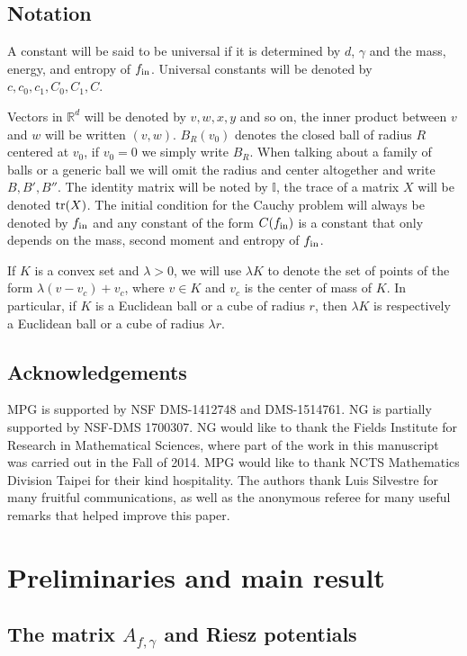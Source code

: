 \documentclass[12pt,american]{amsart}
\numberwithin{equation}{section}
\theoremstyle{plain}
\theoremstyle{definition}                  %
\def\tr{\textnormal{tr}}
\def\fin{f_{\textnormal{in}}}
\begin{document}
\subsection{Notation} 

A constant will be said to be universal if it is determined by $d$, $\gamma$ and the mass, energy, and entropy of $\fin$. Universal constants will be denoted by $c,c_0,c_1,C_0,C_1,C$.

Vectors in $\mathbb{R}^d$ will be denoted by $v,w,x,y$ and so on, the inner product between $v$ and $w$ will be written $(v,w)$. $B_R(v_0)$ denotes the closed ball of radius $R$ centered at $v_0$, if $v_0=0$ we simply write $B_R$. When talking about a family of balls or a generic ball we will omit the radius and center altogether and write $B,B',B''$.
    The identity matrix will be noted by $\mathbb{I}$, the trace of a matrix $X$ will be denoted $\tr(X)$.  The initial condition for the Cauchy problem will always be denoted by $\fin$ and any constant of the form $C(\fin)$ is a constant that only depends on the mass, second moment and entropy of $\fin$.
	
 If $K$ is a convex set and $\lambda>0$, we will use $\lambda K$ to denote the set of points of the form $\lambda (v-v_c)+v_c$, where $v\in K$ and $v_c$ is the center of mass of $K$. In particular, if $K$ is a Euclidean ball or a cube of radius $r$, then $\lambda K$ is respectively a Euclidean ball or a cube of radius $\lambda r$.
    
    
\subsection{Acknowledgements} MPG is supported by NSF DMS-1412748 and DMS-1514761. NG is partially supported by NSF-DMS 1700307. NG would like to thank the Fields Institute for Research in Mathematical Sciences, where part of the work in this manuscript was carried out in the Fall of 2014. MPG would like to thank NCTS Mathematics Division Taipei for their kind hospitality. The authors thank Luis Silvestre for many fruitful communications, as well as the anonymous referee for many useful remarks that helped improve this paper.


\section{Preliminaries and main result}\label{section:preliminaries and main result}


\subsection{The matrix $A_{f,\gamma}$ and Riesz potentials}\label{section:the Matrix A and Riesz potentials}
\end{document}
